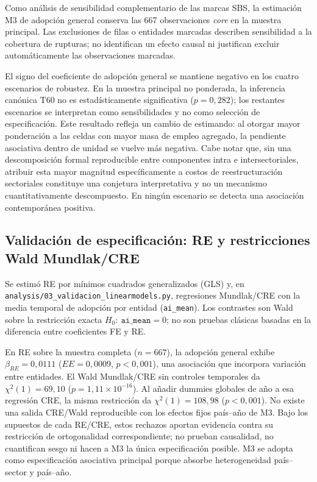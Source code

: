 \documentclass[12pt,a4paper]{article}
\begin{document}
Como análisis de sensibilidad complementario de las marcas SBS, la estimación M3 de adopción general conserva las 667 observaciones \textit{core} en la muestra principal. Las exclusiones de filas o entidades marcadas describen sensibilidad a la cobertura de rupturas; no identifican un efecto causal ni justifican excluir automáticamente las observaciones marcadas.

El signo del coeficiente de adopción general se mantiene negativo en los cuatro escenarios de robustez. En la muestra principal no ponderada, la inferencia canónica T60 no es estadísticamente significativa ($p=0,282$); los restantes escenarios se interpretan como sensibilidades y no como selección de especificación. Este resultado refleja un cambio de estimando: al otorgar mayor ponderación a las celdas con mayor masa de empleo agregado, la pendiente asociativa dentro de unidad se vuelve más negativa. Cabe notar que, sin una descomposición formal reproducible entre componentes intra e intersectoriales, atribuir esta mayor magnitud específicamente a costos de reestructuración sectoriales constituye una conjetura interpretativa y no un mecanismo cuantitativamente descompuesto. En ningún escenario se detecta una asociación contemporánea positiva.

\subsection{Validación de especificación: RE y restricciones Wald Mundlak/CRE}

Se estimó RE por mínimos cuadrados generalizados (GLS) y, en \texttt{analysis/03\_validacion\_linearmodels.py}, regresiones Mundlak/CRE con la media temporal de adopción por entidad (\texttt{ai\_mean}). Los contrastes son Wald sobre la restricción exacta $H_0:\ \texttt{ai\_mean}=0$; no son pruebas clásicas basadas en la diferencia entre coeficientes FE y RE.

En RE sobre la muestra completa ($n=667$), la adopción general exhibe $\beta_{RE}=0,0111$ ($EE=0,0009$, $p<0,001$), una asociación que incorpora variación entre entidades. El Wald Mundlak/CRE sin controles temporales da $\chi^2(1)=69,10$ ($p=1,11\times10^{-16}$). Al añadir dummies globales de año a esa regresión CRE, la misma restricción da $\chi^2(1)=108,98$ ($p<0,001$). No existe una salida CRE/Wald reproducible con los efectos fijos país--año de M3. Bajo los supuestos de cada RE/CRE, estos rechazos aportan evidencia contra su restricción de ortogonalidad correspondiente; no prueban causalidad, no cuantifican sesgo ni hacen a M3 la única especificación posible. M3 se adopta como especificación asociativa principal porque absorbe heterogeneidad país--sector y país--año.
\end{document}
